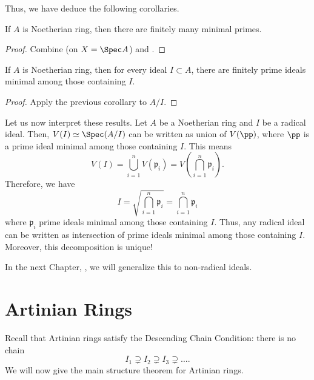 Thus, we have deduce the following corollaries.
\begin{corollary}
    \label{cor:finitely_minimal_primes}
    If $A$ is Noetherian ring, then there are finitely
    many minimal primes.
\end{corollary}
\begin{proof}
    Combine  (on $X=\Spec A$)
    and .
\end{proof}
\begin{corollary}
    If $A$ is Noetherian ring, then
    for every ideal $I\subset A$, there are
    finitely prime ideals minimal among those containing $I$.
\end{corollary}
\begin{proof}
    Apply the previous corollary to $A/I$.
\end{proof}
Let us now interpret these results.
Let $A$ be a Noetherian ring and $I$ be a radical ideal.
Then, $V(I) \simeq \Spec(A/I)$ can be written as
union of $V(\pp)$, where $\pp$ is a prime ideal
minimal among those containing $I$. This means
$$V(I) = \bigcup_{i=1}^n V(\mathfrak p_i)
= V\left(\bigcap_{i=1}^n\mathfrak p_i\right).$$
Therefore, we have
$$I = \sqrt{\bigcap_{i=1}^n\mathfrak p_i}
= \bigcap_{i=1}^n\mathfrak p_i$$
where $\mathfrak p_i$ prime ideals minimal among
those containing $I$.
Thus, any radical ideal can be written as 
intersection of prime ideals minimal among those containing $I$.
Moreover, this decomposition is unique!

In the next Chapter, ,
we will generalize this to non-radical ideals.
%
%
%
%
%
\section{Artinian Rings}
\label{sec:artinian}
Recall that Artinian rings satisfy
the Descending Chain Condition: there is no chain
$$I_1\supsetneq I_2\supsetneq I_3\supsetneq\dots.$$
We will now give the main structure theorem
for Artinian rings.

